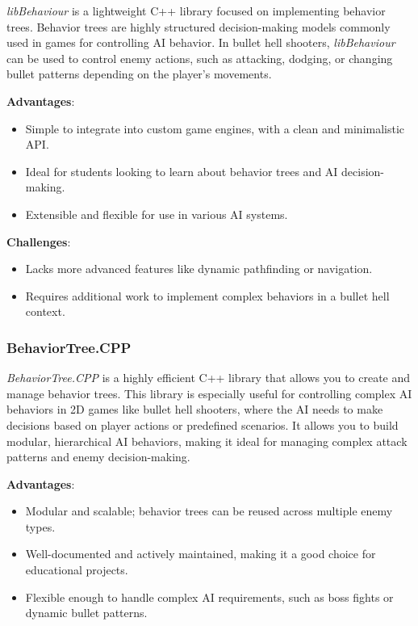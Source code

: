 \documentclass{article} %
\begin{document}
\textit{libBehaviour} is a lightweight C++ library focused on implementing behavior trees. Behavior trees are highly structured decision-making models commonly used in games for controlling AI behavior. In bullet hell shooters, \textit{libBehaviour} can be used to control enemy actions, such as attacking, dodging, or changing bullet patterns depending on the player’s movements.

\textbf{Advantages}:
\begin{itemize}
	\item Simple to integrate into custom game engines, with a clean and minimalistic API.
	\item Ideal for students looking to learn about behavior trees and AI decision-making.
	\item Extensible and flexible for use in various AI systems.
\end{itemize}

\textbf{Challenges}:
\begin{itemize}
	\item Lacks more advanced features like dynamic pathfinding or navigation.
	\item Requires additional work to implement complex behaviors in a bullet hell context.
\end{itemize}

\subsubsection{BehaviorTree.CPP}

\textit{BehaviorTree.CPP} is a highly efficient C++ library that allows you to create and manage behavior trees. This library is especially useful for controlling complex AI behaviors in 2D games like bullet hell shooters, where the AI needs to make decisions based on player actions or predefined scenarios. It allows you to build modular, hierarchical AI behaviors, making it ideal for managing complex attack patterns and enemy decision-making.

\textbf{Advantages}:
\begin{itemize}
	\item Modular and scalable; behavior trees can be reused across multiple enemy types.
	\item Well-documented and actively maintained, making it a good choice for educational projects.
	\item Flexible enough to handle complex AI requirements, such as boss fights or dynamic bullet patterns.
\end{itemize}
\end{document}
